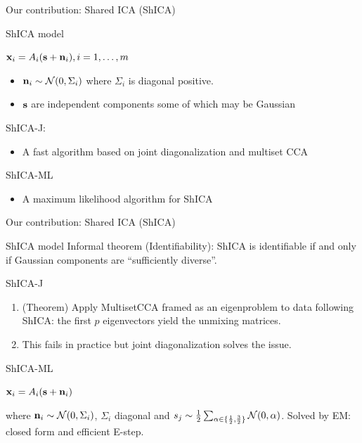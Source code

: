 \documentclass[bigger]{beamer}
\begin{document}
\begin{frame}{Our contribution: Shared ICA (ShICA)}
  \begin{block}{ShICA model}
     \begin{center}$ \mathbf{x}_i = A_i (\mathbf{s} + \mathbf{n}_i), i=1,\dots, m$ \end{center}
    \begin{itemize}
      \item $\mathbf{n}_i \sim \mathcal{N}(0, \Sigma_i)$ where $\Sigma_i$ is diagonal positive.
      \item $\mathbf{s}$ are independent components some of which may be Gaussian
     \end{itemize}
  \end{block}
  \begin{block}{ShICA-J: }
    \begin{itemize}
\item A fast algorithm based on joint diagonalization and multiset CCA
  \end{itemize}
  \end{block}
  \begin{block}{ShICA-ML}
    \begin{itemize}
  \item A maximum likelihood algorithm for ShICA
    \end{itemize}
  \end{block}
\end{frame}


\begin{frame}{Our contribution: Shared ICA (ShICA)}
  \begin{exampleblock}{ShICA model}
    Informal theorem (Identifiability): ShICA is identifiable if and only if Gaussian components are ``sufficiently diverse''.
  \end{exampleblock}
  \begin{exampleblock}{ShICA-J}
    \begin{enumerate}
      \item (Theorem) Apply MultisetCCA framed as an eigenproblem to data
        following ShICA: the first $p$ eigenvectors yield the unmixing matrices. 
        \item This fails in practice but joint diagonalization solves the issue.
    \end{enumerate}
  \end{exampleblock}
  \begin{exampleblock}{ShICA-ML}
    \centerline{$\mathbf{x}_i = A_i (\mathbf{s} + \mathbf{n}_i)$} where $\mathbf{n}_i \sim \mathcal{N}(0, \Sigma_i)$, $\Sigma_i$ diagonal and $s_j
    \sim \frac12 \sum_{\alpha \in \{ \frac12, \frac32 \}} \mathcal{N}(0, \alpha)$.
    Solved by EM: closed form and efficient E-step.
  \end{exampleblock}
\end{frame}
\end{document}
